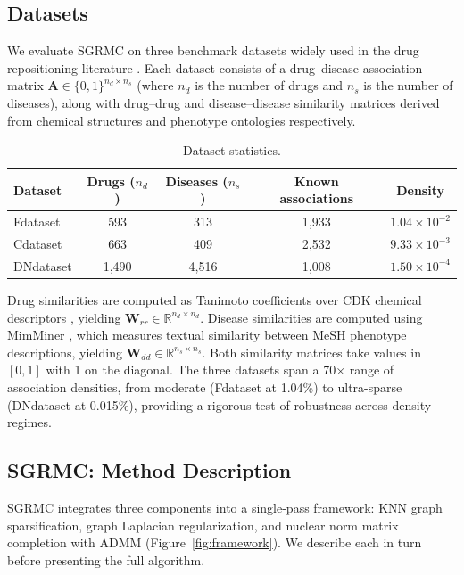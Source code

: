 \documentclass[webpdf,modern,large]{oup-authoring-template}
\newcommand{\R}{\mathbb{R}}
\begin{document}
\subsection{Datasets}

We evaluate SGRMC on three benchmark datasets widely used in the drug repositioning literature \cite{yang2019,luo2016}. Each dataset consists of a drug--disease association matrix $\mathbf{A} \in \{0,1\}^{n_d \times n_s}$ (where $n_d$ is the number of drugs and $n_s$ is the number of diseases), along with drug--drug and disease--disease similarity matrices derived from chemical structures and phenotype ontologies respectively.

\begin{table}[tb]
\centering
\caption{Dataset statistics.}
\label{tab:datasets}
\begin{tabular}{lcccc}
\toprule
Dataset & Drugs ($n_d$) & Diseases ($n_s$) & Known associations & Density \\
\midrule
Fdataset & 593 & 313 & 1,933 & $1.04 \times 10^{-2}$ \\
Cdataset & 663 & 409 & 2,532 & $9.33 \times 10^{-3}$ \\
DNdataset & 1,490 & 4,516 & 1,008 & $1.50 \times 10^{-4}$ \\
\bottomrule
\end{tabular}
\end{table}

Drug similarities are computed as Tanimoto coefficients over CDK chemical descriptors \cite{steinbeck2003}, yielding $\mathbf{W}_{rr} \in \R^{n_d \times n_d}$. Disease similarities are computed using MimMiner \cite{vandriel2006}, which measures textual similarity between MeSH phenotype descriptions, yielding $\mathbf{W}_{dd} \in \R^{n_s \times n_s}$. Both similarity matrices take values in $[0, 1]$ with 1 on the diagonal. The three datasets span a 70$\times$ range of association densities, from moderate (Fdataset at 1.04\%) to ultra-sparse (DNdataset at 0.015\%), providing a rigorous test of robustness across density regimes.

\subsection{SGRMC: Method Description}

SGRMC integrates three components into a single-pass framework: KNN graph sparsification, graph Laplacian regularization, and nuclear norm matrix completion with ADMM (Figure~\ref{fig:framework}). We describe each in turn before presenting the full algorithm.
\end{document}
